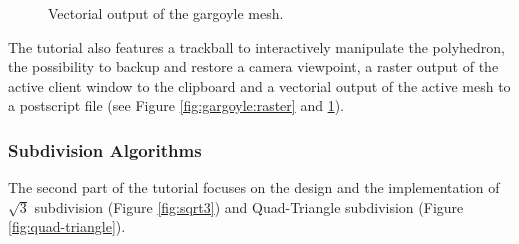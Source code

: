 \documentclass[twocolumn]{article}
\begin{document}
\begin{figure}[t]
    \caption{Vectorial output of the gargoyle mesh.}
    \label{fig:gargoyle:vec}
\end{figure}


The tutorial also features a trackball to interactively manipulate the
polyhedron, the possibility to backup and restore a camera viewpoint,
a raster output of the active client window to the clipboard and a
vectorial output of the active mesh to a postscript file (see Figure
\ref{fig:gargoyle:raster} and \ref{fig:gargoyle:vec}).



\subsubsection*{Subdivision Algorithms}

The second part of the tutorial focuses on the design and the
implementation of $\sqrt{3}$ subdivision (Figure \ref{fig:sqrt3}) 
and Quad-Triangle subdivision (Figure \ref{fig:quad-triangle}).  
\end{document}
